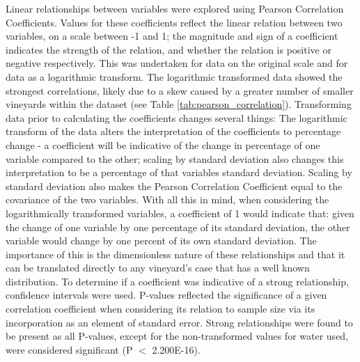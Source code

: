 \documentclass[review,12pt,authoryear]{elsarticle}
\begin{document}
\begin{linenumbers}
Linear relationships between variables were explored using Pearson Correlation Coefficients. Values for these coefficients reflect the linear relation between two variables, on a scale between -1 and 1; the magnitude and sign of a coefficient indicates the strength of the relation, and whether the relation is positive or negative respectively. This was undertaken for data on the original scale and for data as a logarithmic transform. The logarithmic transformed data showed the strongest correlations, likely due to a skew caused by a greater number of smaller vineyards within the dataset (see Table \ref{tab:pearson_correlation}). Transforming data prior to calculating the coefficients changes several things: The logarithmic transform of the data alters the interpretation of the coefficients to percentage change - a coefficient will be indicative of the change in percentage of one variable compared to the other; scaling by standard deviation also changes this interpretation to be a percentage of that variables standard deviation. Scaling by standard deviation also makes the Pearson Correlation Coefficient equal to the covariance of the two variables. With all this in mind, when considering the logarithmically transformed variables, a coefficient of 1 would indicate that: given the change of one variable by one percentage of its standard deviation, the other variable would change by one percent of its own standard deviation. The importance of this is the dimensionless nature of these relationships and that it can be translated directly to any vineyard's case that has a well known distribution.
\newline
To determine if a coefficient was indicative of a strong relationship, confidence intervals were used. P-values reflected the significance of a given correlation coefficient when considering its relation to sample size via its incorporation as an element of standard error. Strong relationships were found to be present as all P-values, except for the non-transformed values for water used, were considered significant (P $<$ 2.200E-16).

\end{linenumbers}
\end{document}
